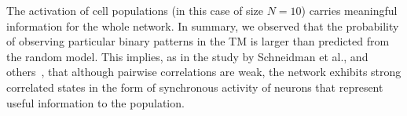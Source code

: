 \documentclass[11pt,letterpaper]{article}
\begin{document}
            The activation of cell populations (in this case of size $N = 10$) carries meaningful
            information for the whole network.
            In summary, we observed that the probability of observing particular binary patterns 
            in the TM is larger than predicted from the random model. 
            This implies, as in the study by Schneidman et al., and 
            others~\cite{schneidman2006weak,koster2014modeling,berkes2011spontaneous}, that although pairwise
            correlations are weak, the network exhibits strong correlated states in the form of synchronous
            activity of neurons that represent useful information to the population.

\end{document}
